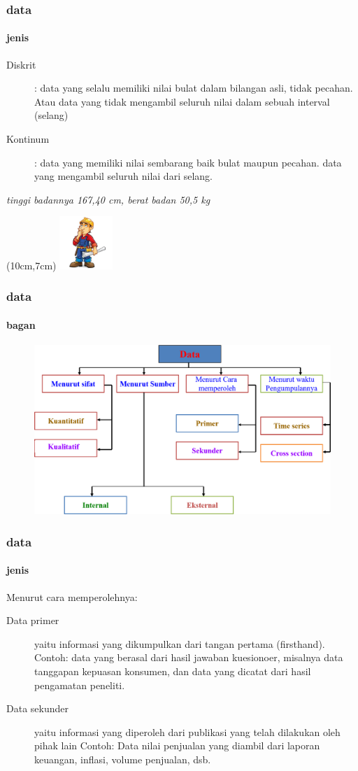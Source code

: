 \documentclass[main.tex]{subfiles}
\begin{document}
\begin{frame}[c]
	\frametitle{data}
	\framesubtitle{jenis}
	\begin{description}
		\item[Diskrit] : data  yang selalu memiliki nilai bulat dalam bilangan asli, tidak pecahan. Atau data yang tidak mengambil seluruh nilai dalam sebuah interval (selang)
		\item[Kontinum] : data yang memiliki nilai sembarang baik bulat maupun pecahan. data yang mengambil seluruh nilai dari selang.
	\end{description}
	\textit{tinggi badannya 167,40 cm,  berat badan 50,5 kg}
	\begin{textblock*}{2cm}(10cm,7cm) %
		\includegraphics[width=2cm]{figures/cons}
	\end{textblock*}
\end{frame}

\begin{frame}[c]
	\frametitle{data}
	\framesubtitle{bagan}

	\begin{figure}
		\begin{center}
			\includegraphics[scale=.4]{figures/bagan}
		\end{center}
	\end{figure}
\end{frame}
\begin{frame}[c]
	\frametitle{data}
	\framesubtitle{jenis}
	Menurut cara memperolehnya:
	\begin{description}
		\item[Data primer] yaitu informasi  yang dikumpulkan dari tangan pertama (firsthand).
			Contoh:  data yang berasal dari hasil jawaban kuesionoer, misalnya data tanggapan kepuasan konsumen, dan data yang dicatat dari hasil pengamatan peneliti.
		\item[Data sekunder] yaitu informasi yang diperoleh dari publikasi yang telah dilakukan oleh pihak lain
			Contoh:  Data nilai penjualan yang diambil dari laporan keuangan, inflasi, volume penjualan, dsb.
	\end{description}
\end{frame}
\end{document}
